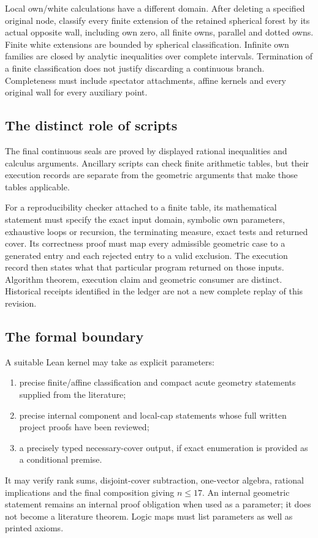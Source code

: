 \documentclass[11pt]{article}
\theoremstyle{definition}
\theoremstyle{remark}
\begin{document}
Local own/white calculations have a different domain.
After deleting a specified original node, classify every
finite extension of the retained spherical forest by its
actual opposite wall, including own zero, all finite owns,
parallel and dotted owns. Finite white extensions are bounded
by spherical classification. Infinite own families are closed
by analytic inequalities over complete intervals.
Termination of a finite classification does not justify
discarding a continuous branch. Completeness must include
spectator attachments, affine kernels and every original
wall for every auxiliary point.

\subsection{The distinct role of scripts}
The final continuous seals are proved by displayed rational
inequalities and calculus arguments. Ancillary scripts can check
finite arithmetic tables, but their execution records are separate
from the geometric arguments that make those tables applicable.

For a reproducibility checker attached to a finite table,
its mathematical statement must specify the exact input
domain, symbolic own parameters, exhaustive loops or recursion,
the terminating measure, exact tests and returned cover.
Its correctness proof must map every admissible geometric
case to a generated entry and each rejected entry to a
valid exclusion. The execution record then states what
that particular program returned on those inputs.
Algorithm theorem, execution claim and geometric consumer
are distinct. Historical receipts identified in the ledger
are not a new complete replay of this revision.

\subsection{The formal boundary}
A suitable Lean kernel may take as explicit parameters:
\begin{enumerate}
\item precise finite/affine classification and compact acute
 geometry statements supplied from the literature;
\item precise internal component and local-cap statements whose
 full written project proofs have been reviewed;
\item a precisely typed necessary-cover output, if exact
 enumeration is provided as a conditional premise.
\end{enumerate}
It may verify rank sums, disjoint-cover subtraction,
one-vector algebra, rational implications and the final
composition giving \(n\leq17\).
An internal geometric statement remains an internal proof
obligation when used as a parameter; it does not become
a literature theorem. Logic maps must list parameters as
well as printed axioms.
\end{document}
